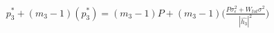 \documentclass[preview]{standalone}
\begin{document}
\begin{align*}
p_3^\ast + \left(m_3 - 1\right) \left(p_3^\ast\right) = \left(m_3 - 1\right) P + \left(m_3 - 1\right) \Bigg( \frac{P \sigma_\epsilon^2 + W_{tot} \sigma^2 }{ \left| \hat{h_3} \right| ^2 } \Bigg)
\end{align*}
\end{document}
